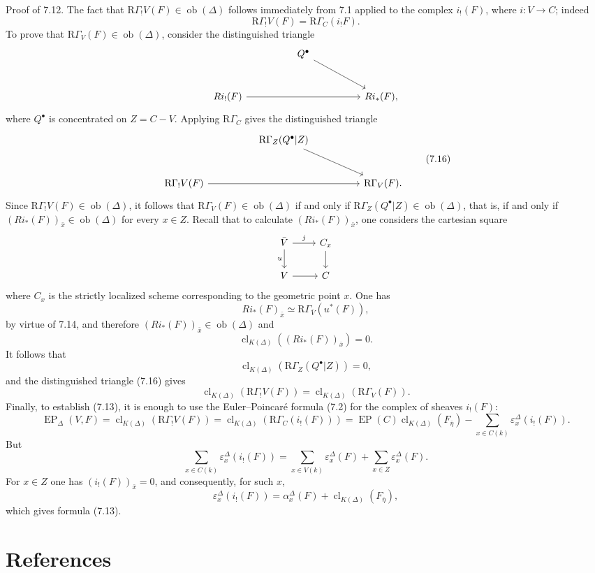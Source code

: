 \documentclass[11pt]{article}
\providecommand{\EP}{\operatorname{EP}}
\providecommand{\Ob}{\operatorname{ob}}
\providecommand{\Ob}{\operatorname{ob}}
\providecommand{\EP}{\operatorname{EP}}
\providecommand{\Ob}{\operatorname{Ob}}
\providecommand{\clK}[1]{\operatorname{cl}_{K(#1)}}
\providecommand{\RG}{\mathrm R\Gamma}
\providecommand{\Ob}{\operatorname{ob}}
\providecommand{\Ob}{\operatorname{Ob}}
\begin{document}
Proof of 7.12. The fact that $\RG_!V(F)\in\Ob(\Delta)$ follows immediately from 7.1 applied to the complex $i_!(F)$, where $i:V\to C$; indeed
\[
\RG_!V(F)=\RG_C(i_!F).
\]
To prove that $\RG_V(F)\in\Ob(\Delta)$, consider the distinguished triangle
\[
\begin{tikzcd}[column sep=huge,row sep=large]
& Q^\bullet \arrow[dr] &\\
Ri_!(F) \arrow[rr] && Ri_*(F),
\end{tikzcd}
\]
where $Q^\bullet$ is concentrated on $Z=C-V$. Applying $\RG_C$ gives the distinguished triangle
\[
\begin{tikzcd}[column sep=huge,row sep=large]
& \RG_Z(Q^\bullet|Z) \arrow[dr] &\\
\RG_!V(F) \arrow[rr] && \RG_V(F).
\end{tikzcd}
\tag{7.16}
\]
Since $\RG_!V(F)\in\Ob(\Delta)$, it follows that $\RG_V(F)\in\Ob(\Delta)$ if and only if $\RG_Z(Q^\bullet|Z)\in\Ob(\Delta)$, that is, if and only if $(Ri_*(F))_{\bar x}\in\Ob(\Delta)$ for every $x\in Z$. Recall that to calculate $(Ri_*(F))_{\bar x}$, one considers the cartesian square
\[
\begin{tikzcd}
\bar V \arrow[r,"j"] \arrow[d,"u"'] & C_x \arrow[d]\\
V \arrow[r] & C
\end{tikzcd}
\]
where $C_x$ is the strictly localized scheme corresponding to the geometric point $x$. One has
\[
Ri_*(F)_{\bar x}\simeq \RG_{\bar V}(u^*(F)),
\]
by virtue of 7.14, and therefore $(Ri_*(F))_{\bar x}\in\Ob(\Delta)$ and
\[
\clK{\Delta}((Ri_*(F))_{\bar x})=0.
\]
It follows that
\[
\clK{\Delta}(\RG_Z(Q^\bullet|Z))=0,
\]
and the distinguished triangle (7.16) gives
\[
\clK{\Delta}(\RG_!V(F))=\clK{\Delta}(\RG_V(F)).
\]
Finally, to establish (7.13), it is enough to use the Euler--Poincaré formula (7.2) for the complex of sheaves $i_!(F)$:
\[
\EP_\Delta(V,F)
=
\clK{\Delta}(\RG_!V(F))
=
\clK{\Delta}(\RG_C(i_!(F)))
=
\EP(C)\clK{\Delta}(F_{\bar\eta})
-\sum_{x\in C(k)}\varepsilon_x^\Delta(i_!(F)).
\]
But
\[
\sum_{x\in C(k)}\varepsilon_x^\Delta(i_!(F))
=
\sum_{x\in V(k)}\varepsilon_x^\Delta(F)
+\sum_{x\in Z}\varepsilon_x^\Delta(F).
\]
For $x\in Z$ one has $(i_!(F))_{\bar x}=0$, and consequently, for such $x$,
\[
\varepsilon_x^\Delta(i_!(F))
=
\alpha_x^\Delta(F)+\clK{\Delta}(F_{\bar\eta}),
\]
which gives formula (7.13).

\section*{References}
\end{document}

